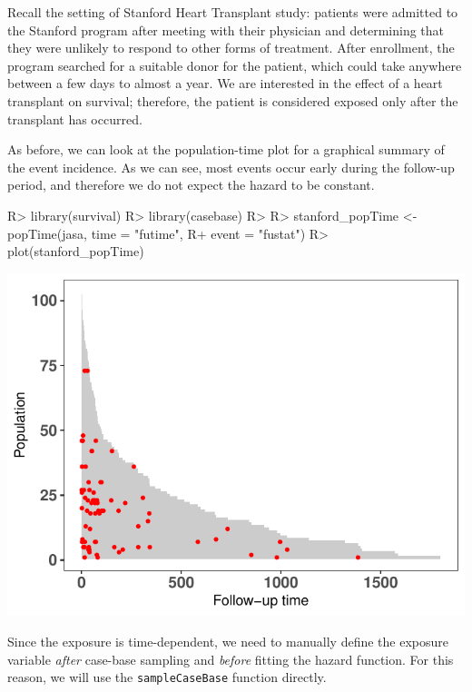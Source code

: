 \documentclass[
]{jss}
\begin{document}
Recall the setting of Stanford Heart Transplant study: patients were
admitted to the Stanford program after meeting with their physician and
determining that they were unlikely to respond to other forms of
treatment. After enrollment, the program searched for a suitable donor
for the patient, which could take anywhere between a few days to almost
a year. We are interested in the effect of a heart transplant on
survival; therefore, the patient is considered exposed only after the
transplant has occurred.

As before, we can look at the population-time plot for a graphical
summary of the event incidence. As we can see, most events occur early
during the follow-up period, and therefore we do not expect the hazard
to be constant.

\begin{CodeChunk}

\begin{CodeInput}
R> library(survival)
R> library(casebase)
R> 
R> stanford_popTime <- popTime(jasa, time = "futime", 
R+                             event = "fustat")
R> plot(stanford_popTime)
\end{CodeInput}


\begin{center}\includegraphics{../figures/stanford-poptime-1} \end{center}

\end{CodeChunk}

Since the exposure is time-dependent, we need to manually define the
exposure variable \emph{after} case-base sampling and \emph{before}
fitting the hazard function. For this reason, we will use the
\texttt{sampleCaseBase} function directly.
\end{document}
